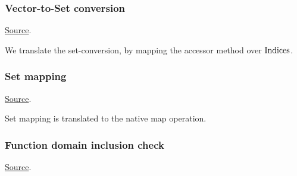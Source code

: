 \subsubsection{ Vector-to-Set conversion}
\href{https://github.com/saltiniroberto/ssf/blob/7ea6e18093d9da3154b4e396dd435549f687e6b9/high_level/common/pythonic_code_generic.py#L87-L88}{Source}.



\begin{mathpar}
\end{mathpar}
We translate the set-conversion, by mapping the accessor method over $\Indices$.

\subsubsection{ Set mapping}
\href{https://github.com/saltiniroberto/ssf/blob/7ea6e18093d9da3154b4e396dd435549f687e6b9/high_level/common/pythonic_code_generic.py#L91-L97}{Source}.



\begin{mathpar}
\end{mathpar}
Set mapping is translated to the \tlap{} native map operation.

\subsubsection{ Function domain inclusion check}
\href{https://github.com/saltiniroberto/ssf/blob/7ea6e18093d9da3154b4e396dd435549f687e6b9/high_level/common/pythonic_code_generic.py#L100-L101}{Source}.


